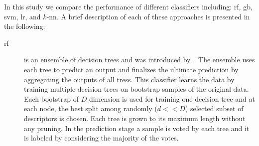 In this study we compare the performance of different classifiers including: \ac{rf}, \ac{gb}, \ac{svm}, \ac{lr}, and $k$-\ac{nn}.
A brief description of each of these approaches is presented in the following:

\begin{description}
\item[\acl{rf}] is an ensemble of decision trees and was introduced by~\cite{breiman2001random}.
The ensemble uses each tree to predict an output and finalizes the ultimate prediction by aggregating the outputs of all tress. 
This classifier learns the data by training multiple decision trees on bootstrap samples of the original data. 
Each bootstrap of $D$ dimension is used for training one decision tree and at each node, the best split among randomly ($d << D$) selected subset of descriptors is chosen. 
Each tree is grown to its maximum length without any pruning. 
In the prediction stage a sample is voted by each tree and it is labeled by considering the majority of the votes.\\


\end{description}
